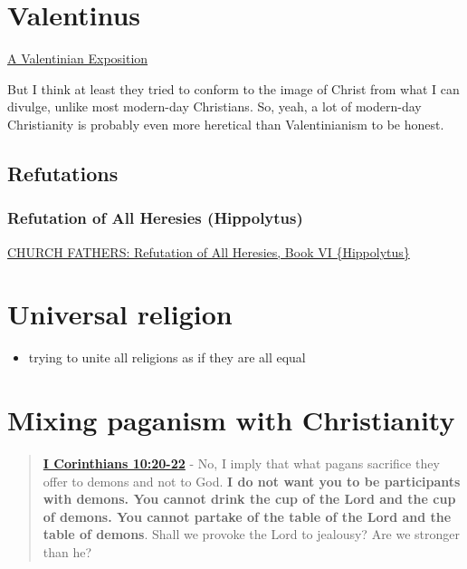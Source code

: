 \documentclass[11pt]{article}
\author{root}
\date{\today}
\title{}
\begin{document}
\tableofcontents

\section{Valentinus}
\label{sec:org1fffe1a}
\href{https://www.earlychristianwritings.com/text/valentinian.html}{A Valentinian Exposition}

But I think at least they tried to conform to the image of Christ from what I can divulge, unlike most modern-day Christians.
So, yeah, a lot of modern-day Christianity is probably even more heretical than Valentinianism to be honest.

\subsection{Refutations}
\label{sec:orgf47ab75}
\subsubsection{Refutation of All Heresies (Hippolytus)}
\label{sec:orga34fb5f}

\href{https://www.newadvent.org/fathers/050106.htm}{CHURCH FATHERS: Refutation of All Heresies, Book VI \{Hippolytus\}}

\section{Universal religion}
\label{sec:orgb3cfc56}
\begin{itemize}
\item trying to unite all religions as if they are all equal
\end{itemize}

\section{Mixing paganism with Christianity}
\label{sec:org5bc9af8}
\begin{quote}
\textbf{\href{https://www.biblegateway.com/passage/?search=1\%20Corinthians\%2010\%3A20-22\&version=ESV}{I Corinthians 10:20-22}} - No, I imply that what pagans sacrifice they offer to demons and not to God. \textbf{I do not want you to be participants with demons. You cannot drink the cup of the Lord and the cup of demons. You cannot partake of the table of the Lord and the table of demons}. Shall we provoke the Lord to jealousy? Are we stronger than he?
\end{quote}
\end{document}
